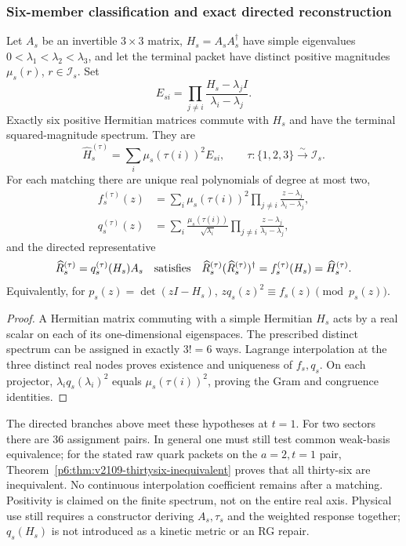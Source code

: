 \documentclass[11pt,a4paper]{article}
\begin{document}
\subsubsection{Six-member classification and exact directed reconstruction}
\begin{theorem}
\label{p6:thm:v585-finite-spectral-assembly}
Let $A_s$ be an invertible $3\times3$ matrix, $H_s=A_sA_s^\dagger$ have
simple eigenvalues $0<\lambda_1<\lambda_2<\lambda_3$, and let the terminal
packet have distinct positive magnitudes $\mu_s(r)$, $r\in\mathcal I_s$.
Set
\[
 E_{si}=\prod_{j\ne i}\frac{H_s-\lambda_jI}{\lambda_i-\lambda_j}.
\]
Exactly six positive Hermitian matrices commute with $H_s$ and have the
terminal squared-magnitude spectrum. They are
\[
 \widehat H_s^{(\tau)}=\sum_i\mu_s(\tau(i))^2E_{si},
 \qquad \tau:\{1,2,3\}\mathrel{\mathop{\longrightarrow}\limits^{\sim}}\mathcal I_s.
\]
For each matching there are unique real polynomials of degree at most two,
\begin{align*}
 f_s^{(\tau)}(z)&=\sum_i\mu_s(\tau(i))^2
                   \prod_{j\ne i}\frac{z-\lambda_j}{\lambda_i-\lambda_j},\\
 q_s^{(\tau)}(z)&=\sum_i\frac{\mu_s(\tau(i))}{\sqrt{\lambda_i}}
                   \prod_{j\ne i}\frac{z-\lambda_j}{\lambda_i-\lambda_j},
\end{align*}
and the directed representative
\[
 \widehat R_s^{(\tau)}=q_s^{(\tau)}(H_s)A_s
 \quad\hbox{satisfies}\quad
 \widehat R_s^{(\tau)}(\widehat R_s^{(\tau)})^\dagger
 =f_s^{(\tau)}(H_s)=\widehat H_s^{(\tau)}.
\]
Equivalently, for $p_s(z)=\det(zI-H_s)$,
$zq_s(z)^2\equiv f_s(z)\pmod{p_s(z)}$.
\end{theorem}
\begin{proof}
A Hermitian matrix commuting with a simple Hermitian $H_s$ acts by a real
scalar on each of its one-dimensional eigenspaces. The prescribed
distinct spectrum can be assigned in exactly $3!=6$ ways. Lagrange
interpolation at the three distinct real nodes proves existence and
uniqueness of $f_s,q_s$. On each projector, $\lambda_i q_s(\lambda_i)^2$
equals $\mu_s(\tau(i))^2$, proving the Gram and congruence identities.
\end{proof}
The directed branches above meet these hypotheses at $t=1$. For two
sectors there are 36 assignment pairs.  In general one must still test
common weak-basis equivalence; for the stated raw quark packets on the
$a=2,t=1$ pair, Theorem~\ref{p6:thm:v2109-thirtysix-inequivalent} proves
that all thirty-six are inequivalent. No continuous
interpolation coefficient remains after a matching. Positivity is claimed
on the finite spectrum, not on the entire real axis. Physical use still
requires a constructor deriving $A_s,\tau_s$ and the weighted response
together; $q_s(H_s)$ is not introduced as a kinetic metric or an RG repair.
\end{document}
